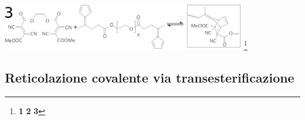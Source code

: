 \begin{frame}
\begin{columns}
\end{columns}
\vspace{-35pt}
{\includegraphics[width=0.8\textwidth]{covalente/diels-alder3.png}}
\footnote{\tiny \leading{3pt} \textbf{1}  \textbf{2}  \textbf{3} }

\end{frame}



\subsection{Reticolazione covalente via transesterificazione}
